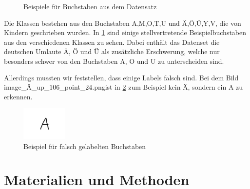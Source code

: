 \documentclass[runningheads,a4paper]{llncs}[2015/06/24]
\begin{document}
\begin{figure}
	\caption{Beispiele für Buchstaben aus dem Datensatz}
	\label{fig:charexample}
\end{figure}
Die Klassen bestehen aus den Buchstaben A,M,O,T,U und Ä,Ö,Ü,Y,V, die von Kindern geschrieben wurden. In \cref{fig:charexample} sind einige stellvertretende Beispielbuchstaben aus den verschiedenen Klassen zu sehen.
Dabei enthält das Datenset die deutschen Umlaute \"{A}, \"{O} und \"{U} als zusätzliche Erschwerung, welche nur besonders schwer von den Buchstaben A, O und U zu unterscheiden sind.

Allerdings mussten wir feststellen, dass einige Labels falsch sind. Bei dem Bild \glqq image\_Ä\_up\_106\_point\_24.png\grqq   ist in \cref{fig:wrongchar} zum Beispiel kein Ä, sondern ein A zu erkennen.

\begin{figure}
	\centering
	\includegraphics[width=0.2\textwidth]{hand_images/image_Ae_up_106_point_24.png}
	
	\caption{Beispiel für falsch gelabelten Buchstaben}
	\label{fig:wrongchar}
\end{figure}

\section{Materialien und Methoden}\label{sec:material}
\end{document}
